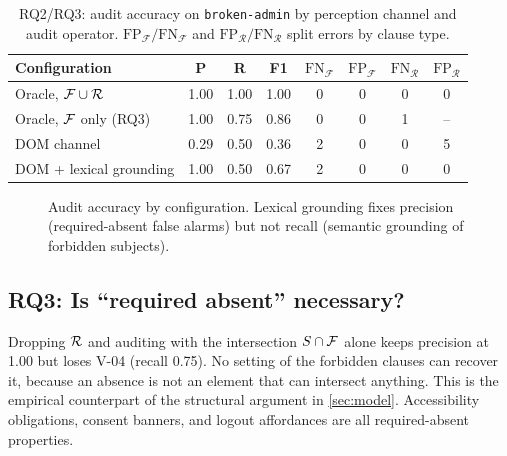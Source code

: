 \begin{table}[t]
\centering\small
\caption{RQ2/RQ3: audit accuracy on \texttt{broken-admin} by perception
channel and audit operator. $\text{FP}_\mathcal F/\text{FN}_\mathcal F$ and
$\text{FP}_\mathcal R/\text{FN}_\mathcal R$ split errors by clause type.}
\label{tab:rq2}
\setlength{\tabcolsep}{2.4pt}\footnotesize
\begin{tabular}{@{}lccccccc@{}}
\toprule
Configuration & P & R & F1 & $\text{FN}_\mathcal F$ & $\text{FP}_\mathcal F$ & $\text{FN}_\mathcal R$ & $\text{FP}_\mathcal R$\\
\midrule
Oracle, $\mathcal{F}\cup\mathcal{R}$ & 1.00 & 1.00 & 1.00 & 0 & 0 & 0 & 0 \\
Oracle, $\mathcal{F}$ only (RQ3) & 1.00 & 0.75 & 0.86 & 0 & 0 & 1 & -- \\
DOM channel & 0.29 & 0.50 & 0.36 & 2 & 0 & 0 & 5 \\
DOM + lexical grounding & 1.00 & 0.50 & 0.67 & 2 & 0 & 0 & 0 \\
\bottomrule
\end{tabular}
\end{table}

\begin{figure}[t]
\centering
{}
\caption{Audit accuracy by configuration. Lexical grounding fixes precision
(required-absent false alarms) but not recall (semantic grounding of
forbidden subjects).}
\label{fig:rq2}
\end{figure}

\subsection{RQ3: Is ``required absent'' necessary?}
\label{sec:eval:rq3}
Dropping $\mathcal{R}$ and auditing with the intersection $S\cap\mathcal{F}$ alone keeps
precision at 1.00 but loses V-04 (recall 0.75). No setting of the forbidden
clauses can recover it, because an absence is not an element that can
intersect anything. This is the empirical counterpart of the structural
argument in \cref{sec:model}. Accessibility obligations, consent banners, and
logout affordances are all required-absent properties.


